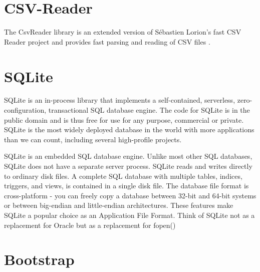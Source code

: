 \section{CSV-Reader}

The CsvReader library is an extended version of Sébastien Lorion's fast CSV Reader project and provides fast parsing and reading of CSV files \cite{csvreader}.

\section{SQLite}

SQLite is an in-process library that implements a self-contained, serverless, zero-configuration, transactional SQL database engine. The code for SQLite is in the public domain and is thus free for use for any purpose, commercial or private. SQLite is the most widely deployed database in the world with more applications than we can count, including several high-profile projects.

SQLite is an embedded SQL database engine. Unlike most other SQL databases, SQLite does not have a separate server process. SQLite reads and writes directly to ordinary disk files. A complete SQL database with multiple tables, indices, triggers, and views, is contained in a single disk file. The database file format is cross-platform - you can freely copy a database between 32-bit and 64-bit systems or between big-endian and little-endian architectures. These features make SQLite a popular choice as an Application File Format. Think of SQLite not as a replacement for Oracle but as a replacement for fopen() \cite{sqlite}


\section{Bootstrap}


